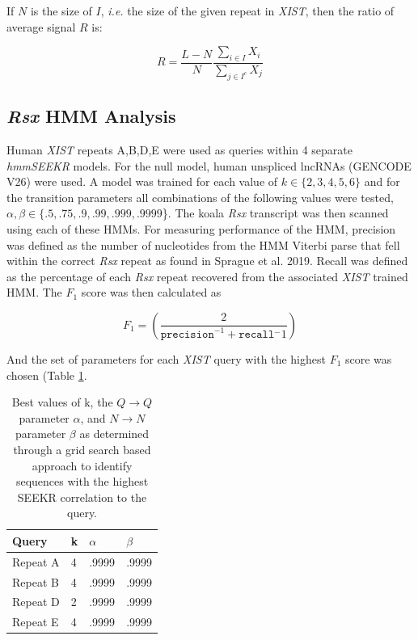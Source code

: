 If $N$ is the size of $I$, \emph{i.e.} the size of the given repeat in \emph{XIST}, then the ratio of average signal $R$ is:

$$R = \frac{L-N}{N}\frac{\sum_{i\in{I}}{X_i}}{{\sum_{j\in{I^c}}{X_j}}}$$

\subsection{\emph{Rsx} HMM Analysis}

Human \emph{XIST} repeats A,B,D,E were used as queries within 4 separate \emph{hmmSEEKR} models. For the null model, human unspliced lncRNAs (GENCODE V26) were used. A model was trained for each value of $k \in \{2,3,4,5,6\}$ and for the transition parameters all combinations of the following values were tested, $\alpha,\beta \in \{.5, .75, .9, .99, .999, .9999$\}. The koala \emph{Rsx} transcript was then scanned using each of these HMMs. For measuring performance of the HMM, precision was defined as the number of nucleotides from the HMM Viterbi parse that fell within the correct \emph{Rsx} repeat as found in Sprague et al. 2019. Recall was defined as the percentage of each \emph{Rsx} repeat recovered from the associated \emph{XIST} trained HMM. The $F_1$ score was then calculated as 

\begin{equation}
    F_1 = \left(\frac{2}{\texttt{precision}^{-1}+\texttt{recall}{^-1}}\right)
\end{equation}

And the set of parameters for each \emph{XIST} query with the highest $F_1$ score was chosen (Table \ref{tbl:rsxparams}.

\begin{table}[h]
\centering
\begin{center}
 \begin{tabular}{|l| l| l | l |} 
 \hline
 Query & k & $\alpha$ & $\beta$ \\
 \hline
 Repeat A & 4 & .9999 & .9999 \\ 
 \hline
 Repeat B & 4 & .9999 & .9999\\
 \hline
 Repeat D & 2 & .9999 & .9999\\
 \hline
 Repeat E & 4 & .9999 & .9999\\
 \hline
\end{tabular}
\end{center}
\caption{Best values of k, the $Q\rightarrow Q$ parameter $\alpha$, and $N\rightarrow N$ parameter $\beta$ as determined through a grid search based approach to identify sequences with the highest SEEKR correlation to the query.}
\label{tbl:rsxparams}
\end{table}

